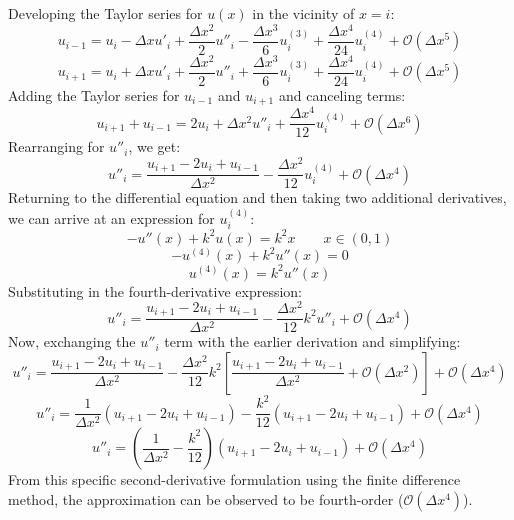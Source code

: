\documentclass[10pt]{article}		%
\numberwithin{equation}{section}
\begin{document}
Developing the Taylor series for $u(x)$ in the vicinity of $x = i$:
\begin{equation}
u_{i-1} = u_i - \Delta x u'_i + \frac{\Delta x^2}{2} u''_i - \frac{\Delta x^3}{6} u^{(3)}_i + \frac{\Delta x^4}{24} u^{(4)}_i + \mathcal{O}(\Delta x^5)
\end{equation}
\begin{equation}
u_{i+1} = u_i + \Delta x u'_i + \frac{\Delta x^2}{2} u''_i + \frac{\Delta x^3}{6} u^{(3)}_i + \frac{\Delta x^4}{24} u^{(4)}_i + \mathcal{O}(\Delta x^5)
\end{equation}
Adding the Taylor series for $u_{i-1}$ and $u_{i+1}$ and canceling terms:
\begin{equation}
u_{i+1} + u_{i-1} = 2u_i + \Delta x^2 u''_i + \frac{\Delta x^4}{12} u^{(4)}_i + \mathcal{O}(\Delta x^6)
\end{equation}
Rearranging for $u''_i$, we get:
\begin{equation}
u''_i = \frac{u_{i+1} -2u_i + u_{i-1}}{\Delta x^2} - \frac{\Delta x^2}{12} u^{(4)}_i + \mathcal{O}(\Delta x^4)
\end{equation}
Returning to the differential equation and then taking two additional derivatives, we can arrive at an expression for $u^{(4)}_i$:
\begin{equation}
-u''(x)+k^2u(x)=k^2x \qquad x \in (0, 1)
\end{equation}
\begin{equation}
-u^{(4)}(x)+k^2u''(x)=0
\end{equation}
\begin{equation}
u^{(4)}(x) = k^2u''(x)
\end{equation}
Substituting in the fourth-derivative expression:
\begin{equation}
u''_i = \frac{u_{i+1} -2u_i + u_{i-1}}{\Delta x^2} - \frac{\Delta x^2}{12} k^2u''_i + \mathcal{O}(\Delta x^4)
\end{equation}
Now, exchanging the $u''_i$ term with the earlier derivation and simplifying:
\begin{equation}
u''_i = \frac{u_{i+1} -2u_i + u_{i-1}}{\Delta x^2} - \frac{\Delta x^2}{12} k^2 \left[\frac{u_{i+1} -2u_i + u_{i-1}}{\Delta x^2} + \mathcal{O}(\Delta x^2) \right] + \mathcal{O}(\Delta x^4)
\end{equation}
\begin{equation}
u''_i = \frac{1}{\Delta x^2} (u_{i+1} -2u_i + u_{i-1}) - \frac{k^2}{12} (u_{i+1} -2u_i + u_{i-1}) + \mathcal{O}(\Delta x^4)
\end{equation}
\begin{equation}
u''_i = \left(\frac{1}{\Delta x^2} - \frac{k^2}{12}\right) (u_{i+1} -2u_i + u_{i-1}) + \mathcal{O}(\Delta x^4)
\end{equation}
From this specific second-derivative formulation using the finite difference method, the approximation can be observed to be fourth-order ($\mathcal{O}(\Delta x^4)$).
\end{document}
